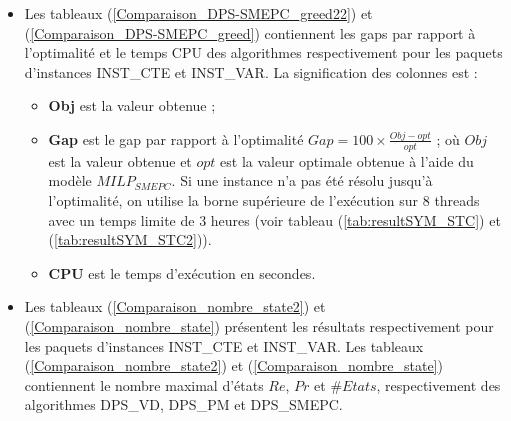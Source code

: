 \begin{itemize}[label=$\square$]
	
	\item Les tableaux (\ref{Comparaison_DPS-SMEPC_greed22}) et (\ref{Comparaison_DPS-SMEPC_greed}) contiennent les gaps par rapport à l'optimalité et le temps CPU des algorithmes respectivement pour les paquets d'instances INST\_CTE et INST\_VAR.
	La signification des colonnes est :
	\begin{itemize}
		\item  \textbf{Obj} est la valeur obtenue ;
		\item \textbf{Gap} est le gap par rapport à l'optimalité $Gap  = 100 \times \frac{Obj-opt}{opt}$ ; où $Obj$ est la valeur obtenue et $opt$ est la valeur optimale obtenue à l'aide du modèle $MILP_{SMEPC}$. Si une instance n'a pas été résolu jusqu'à l'optimalité, on utilise la borne supérieure de l'exécution sur 8 threads avec un temps limite de 3 heures (voir tableau (\ref{tab:resultSYM_STC}) et (\ref{tab:resultSYM_STC2})). %
		\item \textbf{CPU} est le temps d'exécution en secondes. 
	\end{itemize}
	\item Les tableaux (\ref{Comparaison_nombre_state2}) et (\ref{Comparaison_nombre_state}) présentent les résultats respectivement pour les paquets d'instances INST\_CTE et INST\_VAR. Les tableaux (\ref{Comparaison_nombre_state2}) et (\ref{Comparaison_nombre_state}) contiennent le nombre maximal d'états $Re$, $Pr$ et $\# Etats$, respectivement des algorithmes DPS\_VD, DPS\_PM et DPS\_SMEPC.
	
	  
\end{itemize}

